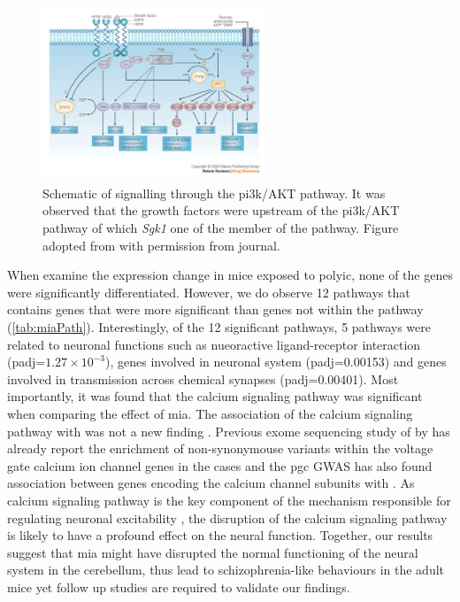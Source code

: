 \begin{figure}
	\centering
	\includegraphics[width=0.6\textwidth]{figure/omega/pi3ksignaling.jpg}
	\caption[Schematic of signalling through the PI3K/AKT pathway]{
		Schematic of signalling through the \gls{pi3k}/AKT pathway.
		It was observed that the growth factors were upstream of the \gls{pi3k}/AKT pathway of which \textit{Sgk1} one of the member of the pathway.
		Figure adopted from \citet{Hennessy2005} with permission from journal.
	}\label{fig:pi3kPathway}
\end{figure}
When examine the expression change in mice exposed to \gls{polyic}, none of the genes were significantly differentiated. 
However, we do observe 12 pathways that contains genes that were more significant than genes not within the pathway (\cref{tab:miaPath}).
Interestingly, of the 12 significant pathways, 5 pathways were related to neuronal functions such as nueoractive ligand-receptor interaction (padj=$1.27\times 10^{-3}$), genes involved in neuronal system (padj=0.00153) and genes involved in transmission across chemical synapses (padj=0.00401).
Most importantly, it was found that the calcium signaling pathway was significant when comparing the effect of \gls{mia}. 
The association of the calcium signaling pathway with  was not a new finding \citep{Lidow2003,Purcell2014,Ripke2013}.
Previous exome sequencing study of  by \citet{Purcell2014} has already report the enrichment of non-synonymouse variants within the voltage gate calcium ion channel genes in the  cases and the \gls{pgc}  \gls{GWAS} has also found association between genes encoding the calcium channel subunits with .
As calcium signaling pathway is the key component of the mechanism responsible for regulating neuronal excitability \citep{Berridge2014}, the disruption of the calcium signaling pathway is likely to have a profound effect on the neural function. 
Together, our results suggest that \gls{mia} might have disrupted the normal functioning of the neural system in the cerebellum, thus lead to schizophrenia-like behaviours in the adult mice yet follow up studies are required to validate our findings.

